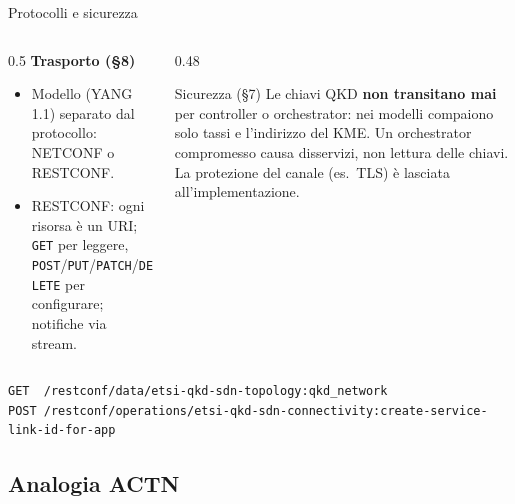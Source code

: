 \documentclass[10pt]{beamer}
\begin{document}
\begin{frame}[fragile]{Protocolli e sicurezza}
  \begin{columns}[T]
    \begin{column}{0.5\textwidth}
      \textbf{Trasporto (§8)}
      \begin{itemize}\small
        \item Modello (YANG 1.1) separato dal protocollo: NETCONF o
              RESTCONF.
        \item RESTCONF: ogni risorsa è un URI; \texttt{GET} per leggere,
              \texttt{POST}/\texttt{PUT}/\texttt{PATCH}/\texttt{DELETE}
              per configurare; notifiche via stream.
      \end{itemize}
    \end{column}
    \begin{column}{0.48\textwidth}
      \begin{alertblock}{Sicurezza (§7)}
        \small Le chiavi QKD \textbf{non transitano mai} per controller o
        orchestrator: nei modelli compaiono solo tassi e l'indirizzo del KME.
        Un orchestrator compromesso causa disservizi, non lettura delle chiavi.
        La protezione del canale (es.\ TLS) è lasciata all'implementazione.
      \end{alertblock}
    \end{column}
  \end{columns}
  \vspace{1ex}
\begin{lstlisting}
GET  /restconf/data/etsi-qkd-sdn-topology:qkd_network
POST /restconf/operations/etsi-qkd-sdn-connectivity:create-service-link-id-for-app
\end{lstlisting}
\end{frame}

\subsection{Analogia ACTN}
\end{document}
